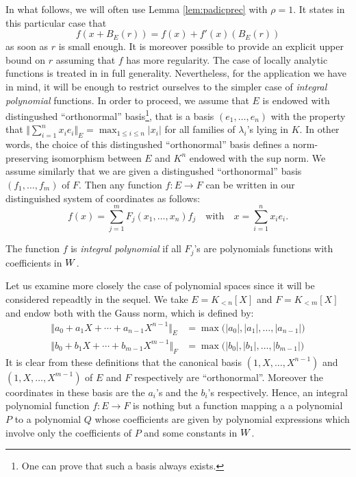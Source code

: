 \documentclass{article}
\begin{document}
In what follows, we will often use Lemma \ref{lem:padicprec} with
$\rho = 1$. It states in this particular case that 
\begin{equation}
\label{eq:padicprec2}
f(x + B_E(r)) = f(x) + f'(x)(B_E(r))
\end{equation}
as soon as $r$ is small enough. It is moreover possible to provide
an explicit upper bound on $r$ assuming that $f$ has more regularity.
The case of locally analytic functions is treated in \cite{padicprec}
in full generality. Nevertheless, for the application we have in mind, 
it will be enough to restrict ourselves to the simpler case of 
\emph{integral polynomial} functions. In order to proceed, we assume 
that $E$ is endowed with distingushed ``orthonormal'' 
basis\footnote{One can prove that such a basis always exists.}, that is 
a basis $(e_1, \ldots, e_n)$ with the property that $\Vert \sum_{i=1}^n 
x_i e_i \Vert_E = \max_{1\leq i \leq n} |x_i|$ for all 
families of $\lambda_i$'s lying in $K$. In other words, the choice of
this distingushed ``orthonormal'' basis defines a norm-preserving 
isomorphism between $E$ and $K^n$ endowed with the sup norm. We assume
similarly that we are given a distingushed ``orthonormal'' basis
$(f_1, \ldots, f_m)$ of $F$. Then any function $f : E \to F$ can
be written in our distinguished system of coordinates as follows:
$$f(x) = \sum_{j=1}^m F_j(x_1, \ldots, x_n) f_j
\quad \text{with} \quad x = \sum_{i=1}^n x_i e_i.$$

\begin{deftn}
The function $f$ is \emph{integral polynomial} if all $F_j$'s are
polynomials functions with coefficients in $W$.
\end{deftn}

\begin{ex}
\label{ex:Gaussnorm}
Let us examine more closely the case of polynomial spaces since it will 
be considered repeadtly in the sequel. We take $E = K_{<n}[X]$ and $F = 
K_{<m}[X]$ and endow both with the Gauss norm, which is defined by:
\begin{align*}
\Vert a_0 + a_1 X + \cdots + a_{n-1} X^{n-1} \Vert_E & 
  = \max \big(|a_0|, |a_1|, \ldots, |a_{n-1}|\big) \\
\Vert b_0 + b_1 X + \cdots + b_{m-1} X^{m-1} \Vert_F & 
  = \max \big(|b_0|, |b_1|, \ldots, |b_{m-1}|\big)
\end{align*}
It is clear from these definitions that the canonical basis $(1, X, 
\ldots, X^{n-1})$ and $(1, X, \ldots, X^{m-1})$ of $E$ and $F$ 
respectively are ``orthonormal''. Moreover the coordinates in these
basis are the $a_i$'s and the $b_i$'s respectively. Hence, an integral
polynomial function $f : E \to F$ is nothing but a function mapping a
a polynomial $P$ to a polynomial $Q$ whose coefficients are given by
polynomial expressions which involve only the coefficients of $P$ and 
some constants in $W$.
\end{ex}
\end{document}

